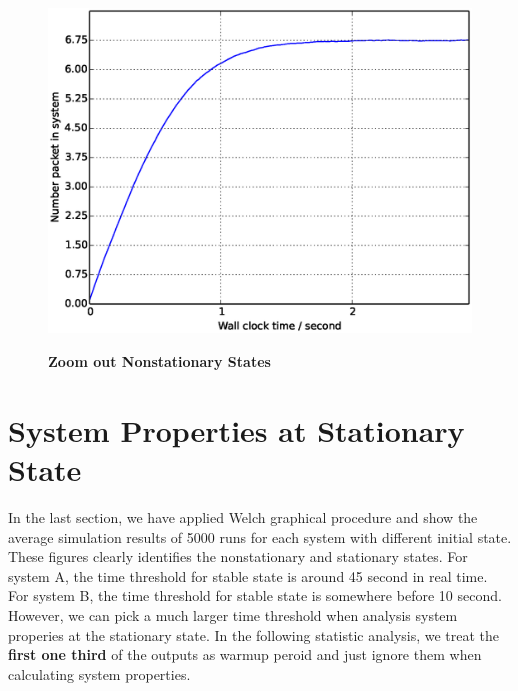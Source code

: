 \documentclass[12pt]{article}  %
\theoremstyle{definition}
\theoremstyle{remark}
\begin{document}
\begin{figure}
{        \includegraphics[scale=0.4]{Lmda10Init0OflAvg5000.eps}
        \label{fig:systemBinit0warmup}
}
\hfill
{}
\caption{\textbf{Zoom out Nonstationary States}}
\end{figure}




\section{System Properties at Stationary State}
In the last section, we have applied Welch graphical procedure and show the average simulation results of 5000 runs for each system with different initial state.
These figures clearly identifies the nonstationary and stationary states.
For system A, the time threshold for stable state is around 45 second in real time.
For system B, the time threshold for stable state is somewhere before 10 second.
However, we can pick a much larger time threshold when analysis system properies at the stationary state.
In the following statistic analysis, we treat the \textbf{first one third} of the outputs as warmup peroid and just ignore them when calculating system properties.
\end{document}
